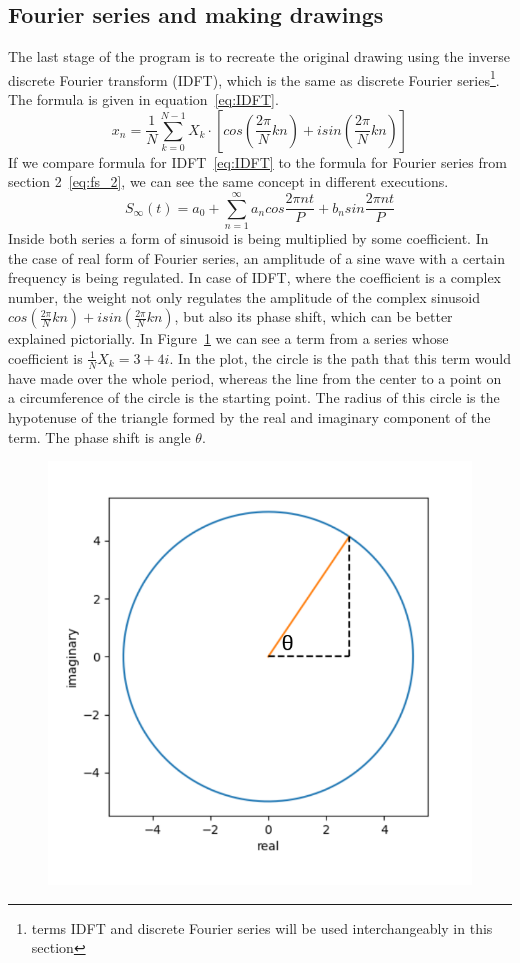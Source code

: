 \documentclass[titlepage]{article}
\begin{document}
\subsection{Fourier series and making drawings}

    The last stage of the program is to recreate the original drawing using the
    inverse discrete Fourier transform (IDFT), which is the same as discrete
    Fourier series\footnote{terms IDFT and discrete Fourier series will be used
    interchangeably in this section}. The formula is given in equation~\eqref{eq:IDFT}.
    \begin{equation}\label{eq:IDFT}
        x_n = \frac{1}{N}\sum_{k=0}^{N-1}X_k \cdot \left[cos\left(\frac{2\pi}{N}kn\right) +
        isin\left(\frac{2\pi}{N}kn\right)\right]
    \end{equation}
    If we compare formula for IDFT~\eqref{eq:IDFT} to the formula for Fourier
    series from section 2~\eqref{eq:fs_2}, we can see the same concept in different
    executions.
    \begin{equation} \label{eq:fs_2}
        S_\infty(t) = a_0 + \sum_{n=1}^{\infty}a_ncos\frac{2\pi nt}{P} + b_n%
            sin\frac{2\pi nt}{P}
    \end{equation}
    Inside both series a form of sinusoid is being multiplied by some coefficient.
    In the case of real form of Fourier series, an amplitude of a sine wave with
    a certain frequency is being regulated. In case of IDFT, where the coefficient
    is a complex number, the weight not only regulates the amplitude of the complex
    sinusoid $cos\left(\frac{2\pi}{N}kn\right) + isin\left(\frac{2\pi}{N}kn\right)$,
    but also its phase shift, which can be better explained pictorially.
    In Figure~\ref{fig:idft_expl_1} we can see a term from a series whose coefficient
    is $\frac{1}{N}X_k = 3+4i$. In the plot, the circle is the path that this 
    term would have made over the whole period, whereas the line from the center
    to a point on a circumference of the circle is the starting point. The radius
    of this circle is the hypotenuse of the triangle formed by the real and imaginary
    component of the term. The phase shift is angle $\theta$. 
    \begin{figure}[H]
        \caption{}
        \centering
        \includegraphics[width=0.4\linewidth]{dfs_explainer_1}
        \label{fig:idft_expl_1}
    \end{figure} 
\end{document}
